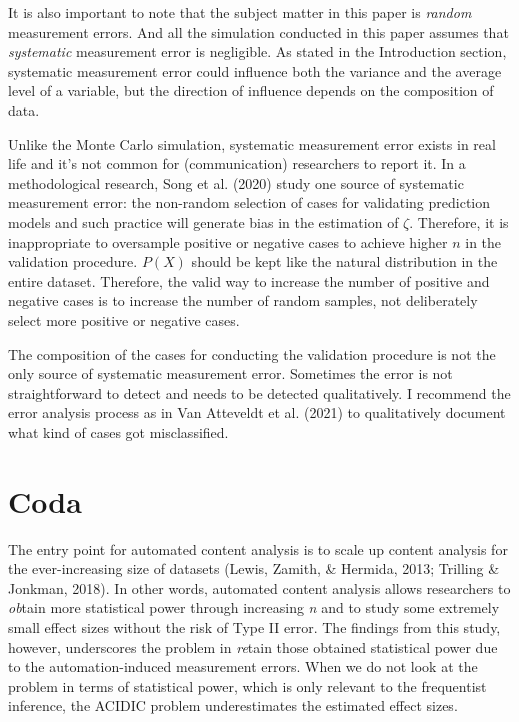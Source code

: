 \documentclass[english,man,floatsintext]{apa6}
\begin{document}
It is also important to note that the subject matter in this paper is \emph{random} measurement errors. And all the simulation conducted in this paper assumes that \emph{systematic} measurement error is negligible. As stated in the Introduction section, systematic measurement error could influence both the variance and the average level of a variable, but the direction of influence depends on the composition of data.

Unlike the Monte Carlo simulation, systematic measurement error exists in real life and it's not common for (communication) researchers to report it. In a methodological research, Song et al. (2020) study one source of systematic measurement error: the non-random selection of cases for validating prediction models and such practice will generate bias in the estimation of \(\zeta\). Therefore, it is inappropriate to oversample positive or negative cases to achieve higher \(n\) in the validation procedure. \(P(X)\) should be kept like the natural distribution in the entire dataset. Therefore, the valid way to increase the number of positive and negative cases is to increase the number of random samples, not deliberately select more positive or negative cases.

The composition of the cases for conducting the validation procedure is not the only source of systematic measurement error. Sometimes the error is not straightforward to detect and needs to be detected qualitatively. I recommend the error analysis process as in Van Atteveldt et al. (2021) to qualitatively document what kind of cases got misclassified.

\hypertarget{coda}{%
\section{Coda}\label{coda}}

The entry point for automated content analysis is to scale up content analysis for the ever-increasing size of datasets (Lewis, Zamith, \& Hermida, 2013; Trilling \& Jonkman, 2018). In other words, automated content analysis allows researchers to \emph{ob}tain more statistical power through increasing \emph{n} and to study some extremely small effect sizes without the risk of Type II error. The findings from this study, however, underscores the problem in \emph{re}tain those obtained statistical power due to the automation-induced measurement errors. When we do not look at the problem in terms of statistical power, which is only relevant to the frequentist inference, the ACIDIC problem underestimates the estimated effect sizes.
\end{document}
